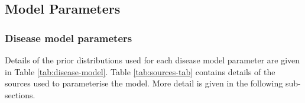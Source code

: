 \documentclass[11pt,twoside]{bristolthesis}
\begin{document}
  \hypertarget{model-parameters}{%
  \subsection{Model Parameters}\label{model-parameters}}
  
  \hypertarget{disease-model-parameters}{%
  \subsubsection{Disease model parameters}\label{disease-model-parameters}}
  
  Details of the prior distributions used for each disease model parameter are given in Table \ref{tab:disease-model}. Table \ref{tab:sources-tab} contains details of the sources used to parameterise the model. More detail is given in the following sub-sections.
\end{document}
